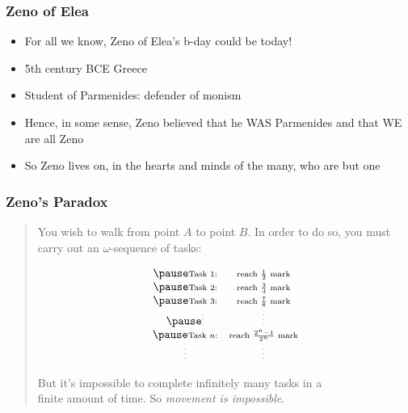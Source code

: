 \begin{frame}
\frametitle{Zeno of Elea}

\begin{itemize}[<+->]

\item For all we know, Zeno of Elea's b-day could be today!

\item 5th century BCE Greece

\item Student of Parmenides: defender of monism 

\item Hence, in some sense, Zeno believed that he WAS Parmenides and that WE are all Zeno

\item So Zeno lives on, in the hearts and minds of the many, who are but one 

\end{itemize}
\end{frame}


\begin{frame}
\frametitle{Zeno's Paradox}

\begin{quote}
You wish to walk from point $A$ to point $B$. In order to do so, you must carry out an \(\omega\)-sequence of tasks:
\medskip
\begin{center}
\end{center}
\[
\begin{array}{cc}
\pause \text{\scriptsize Task  1:} & \text{\scriptsize reach $\frac{1}{2}$ mark}\\
\pause \text{\scriptsize Task  2:} & \text{\scriptsize reach $\frac{3}{4}$ mark}\\
\pause \text{\scriptsize Task  3:} & \text{\scriptsize reach $\frac{7}{8}$ mark}\\
\pause \text{\tiny\vdots} & \text{\tiny\vdots}\\
\pause \text{\scriptsize Task  $n$:} & \text{\scriptsize reach $\frac{2^n-1}{2^n}$ mark}\\
\text{\tiny\vdots} & \text{\tiny\vdots}\\
\end{array}
\]

\pause 
But it's impossible to complete infinitely many tasks in a \\ finite amount of time. So \emph{movement is impossible}. 
\end{quote}
\end{frame}

